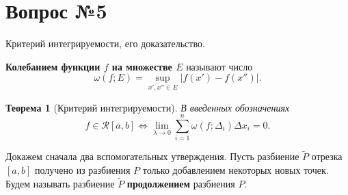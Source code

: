 \documentclass[12pt]{report}
\numberwithin{equation}{section}
\newtheorem{theorem}{Теорема}[section]
\begin{document}
\newpage \section{Вопрос №5} %
\begin{framed}
Критерий интегрируемости, его доказательство.
\end{framed}

\textbf{Колебанием функции $f$ на множестве $E$} называют число
\[ \omega(f;E) = \sup_{x', x'' \in E} | f(x') - f(x'') |.\]

\begin{theorem}[Критерий интегрируемости]
В введенных обозначениях
\[ f \in \mathcal{R}[a,b] \iff \lim_{\lambda \to 0} \sum_{i=1}^n \omega(f; \Delta_i) \Delta x_i = 0. \]
\end{theorem}
Докажем сначала два вспомогательных утверждения. Пусть разбиение $\tilde{P}$ отрезка $[a,b]$ получено из разбиения $P$ только добавлением некоторых новых точек. Будем называть разбиение $\tilde{P}$ \textbf{продолжением} разбиения $P$.\\
\end{document}
